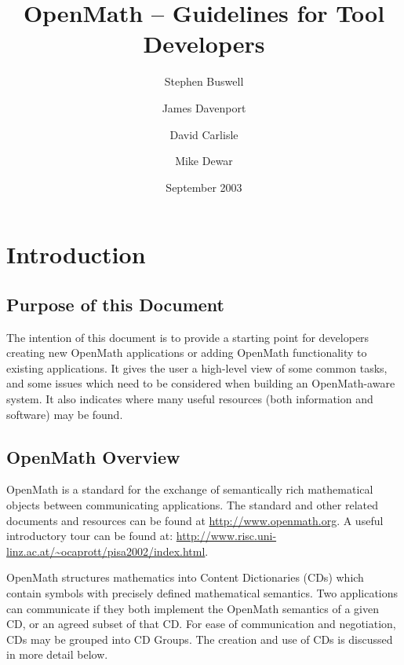 \documentclass[keylogo]{openmath}
\begin{document}
\title{OpenMath -- Guidelines for Tool Developers}
\author{Stephen Buswell}
\address{Stilo}
\author{James Davenport}
\address{Univ.Bath}
\author{David Carlisle}
\address{NAG}
\author{Mike Dewar}
\address{NAG}

\date{September 2003}

\def\arccot{\mathop{\rm arccot}}
\def\arctanD{\underbrace{\mathop{\rm arctan}\nolimits{}}_{\mathop{\rm Derive}\nolimits}}
\let\rule\endgraf
\def\C{\mathbb{C}}
\def\R{\mathbb{R}}
\def\K{\mathcal{K}}
\let\subsubsubsection\paragraph
\let\subsubsubsubsection\subparagraph
\setcounter{secnumdepth}{6}
\setcounter{tocdepth}{3}
\maketitle
\tableofcontents

\section {Introduction}

\subsection {Purpose of this Document}
The intention of this document is to provide a starting point for
developers creating new OpenMath applications or adding OpenMath
functionality to existing applications. It gives the user a high-level
view of some common tasks, and some issues which need to be considered
when building an OpenMath-aware system. It also indicates where many
useful resources (both information and software) may be found.

\subsection {OpenMath Overview} 

OpenMath is a standard for the exchange of semantically rich
mathematical objects between communicating applications. The standard
and other related documents and resources can be found at
\url{http://www.openmath.org}.  A useful introductory
tour can be found at:
\url{http://www.risc.uni-linz.ac.at/~ocaprott/pisa2002/index.html}.

OpenMath structures mathematics into Content Dictionaries (CDs) which
contain symbols with precisely defined mathematical semantics. Two
applications can communicate if they both implement the OpenMath
semantics of a given CD, or an agreed subset of that CD. For ease of
communication and negotiation, CDs may be grouped into CD Groups.  The
creation and use of CDs is discussed in more detail below.
\end{document}
